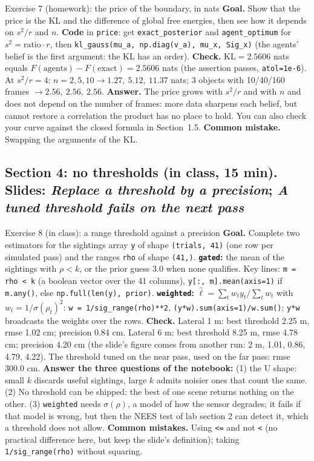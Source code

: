 \documentclass[11pt]{article}
\begin{document}
\begin{labhelp}{Exercise 7 (homework): the price of the boundary, in nats}
\textbf{Goal.} Show that the price is the KL and the difference of global free energies, then see how it depends on $s^2/r$ and $n$. \textbf{Code} in \texttt{price}: get \texttt{exact\_posterior} and \texttt{agent\_optimum} for $s^2=\text{ratio}\cdot r$, then \texttt{kl\_gauss(mu\_a, np.diag(v\_a), mu\_x, Sig\_x)} (the agents' belief is the first argument: the KL has an order). \textbf{Check.} $\text{KL}=2.5606$ nats equals $F(\text{agents})-F(\text{exact})=2.5606$ nats (the assertion passes, \texttt{atol=1e-6}). At $s^2/r=4$: $n=2,5,10\to 1.27,\ 5.12,\ 11.37$ nats; 3 objects with 10/40/160 frames $\to 2.56,\ 2.56,\ 2.56$. \textbf{Answer.} The price grows with $s^2/r$ and with $n$ and does not depend on the number of frames: more data sharpens each belief, but cannot restore a correlation the product has no place to hold. You can also check your curve against the closed formula in Section~1.5. \textbf{Common mistake.} Swapping the arguments of the KL.
\end{labhelp}

\subsection*{Section 4: no thresholds (in class, 15 min). Slides: \emph{Replace a threshold by a precision}; \emph{A tuned threshold fails on the next pass}}

\begin{labhelp}{Exercise 8 (in class): a range threshold against a precision}
\textbf{Goal.} Complete two estimators for the sightings array \texttt{y} of shape \texttt{(trials, 41)} (one row per simulated pass) and the ranges \texttt{rho} of shape \texttt{(41,)}. \textbf{\texttt{gated}:} the mean of the sightings with $\rho<k$, or the prior guess 3.0 when none qualifies. Key lines: \texttt{m = rho < k} (a boolean vector over the 41 columns), \texttt{y[:, m].mean(axis=1)} if \texttt{m.any()}, else \texttt{np.full(len(y), prior)}. \textbf{\texttt{weighted}:} $\hat\ell=\sum_t w_ty_t/\sum_tw_t$ with $w_t=1/\sigma(\rho_t)^2$: \texttt{w = 1/sig\_range(rho)**2}, \texttt{(y*w).sum(axis=1)/w.sum()}; \texttt{y*w} broadcasts the weights over the rows. \textbf{Check.} Lateral 1 m: best threshold 2.25 m, rmse 1.02 cm; precision 0.84 cm. Lateral 6 m: best threshold 8.25 m, rmse 4.78 cm; precision 4.20 cm (the slide's figure comes from another run: 2 m, 1.01, 0.86, 4.79, 4.22). The threshold tuned on the near pass, used on the far pass: rmse 300.0 cm. \textbf{Answer the three questions of the notebook:} (1) the U shape: small $k$ discards useful sightings, large $k$ admits noisier ones that count the same. (2) No threshold can be shipped: the best of one scene returns nothing on the other. (3) \texttt{weighted} needs $\sigma(\rho)$, a model of how the sensor degrades; it fails if that model is wrong, but then the NEES test of lab section 2 can detect it, which a threshold does not allow. \textbf{Common mistakes.} Using \texttt{<=} and not \texttt{<} (no practical difference here, but keep the slide's definition); taking \texttt{1/sig\_range(rho)} without squaring.
\end{labhelp}
\end{document}
